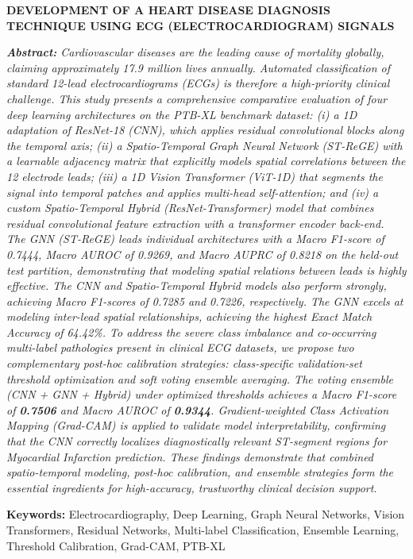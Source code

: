 \documentclass[14pt]{extarticle}
\begin{document}
{\begin{center}
\bfseries\Large
DEVELOPMENT OF A HEART DISEASE DIAGNOSIS TECHNIQUE USING ECG (ELECTROCARDIOGRAM) SIGNALS
\end{center}
\vspace{1.5em}
{\itshape
\noindent \textbf{Abstract:} 
Cardiovascular diseases are the leading cause of mortality globally, claiming approximately 17.9 million lives annually. Automated classification of standard 12-lead electrocardiograms (ECGs) is therefore a high-priority clinical challenge. This study presents a comprehensive comparative evaluation of four deep learning architectures on the PTB-XL benchmark dataset: (i) a 1D adaptation of ResNet-18 (CNN), which applies residual convolutional blocks along the temporal axis; (ii) a Spatio-Temporal Graph Neural Network (ST-ReGE) with a learnable adjacency matrix that explicitly models spatial correlations between the 12 electrode leads; (iii) a 1D Vision Transformer (ViT-1D) that segments the signal into temporal patches and applies multi-head self-attention; and (iv) a custom Spatio-Temporal Hybrid (ResNet-Transformer) model that combines residual convolutional feature extraction with a transformer encoder back-end. The GNN (ST-ReGE) leads individual architectures with a Macro F1-score of 0.7444, Macro AUROC of 0.9269, and Macro AUPRC of 0.8218 on the held-out test partition, demonstrating that modeling spatial relations between leads is highly effective. The CNN and Spatio-Temporal Hybrid models also perform strongly, achieving Macro F1-scores of 0.7285 and 0.7226, respectively. The GNN excels at modeling inter-lead spatial relationships, achieving the highest Exact Match Accuracy of 64.42\%. To address the severe class imbalance and co-occurring multi-label pathologies present in clinical ECG datasets, we propose two complementary post-hoc calibration strategies: class-specific validation-set threshold optimization and soft voting ensemble averaging. The voting ensemble (CNN + GNN + Hybrid) under optimized thresholds achieves a Macro F1-score of \textbf{0.7506} and Macro AUROC of \textbf{0.9344}. Gradient-weighted Class Activation Mapping (Grad-CAM) is applied to validate model interpretability, confirming that the CNN correctly localizes diagnostically relevant ST-segment regions for Myocardial Infarction prediction. These findings demonstrate that combined spatio-temporal modeling, post-hoc calibration, and ensemble strategies form the essential ingredients for high-accuracy, trustworthy clinical decision support.


\noindent \textbf{Keywords:} Electrocardiography, Deep Learning, Graph Neural Networks, Vision Transformers, Residual Networks, Multi-label Classification, Ensemble Learning, Threshold Calibration, Grad-CAM, PTB-XL
\par
}
}
\vspace{1.5em}
\end{document}
